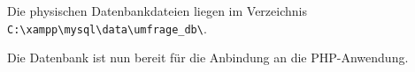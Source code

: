 Die physischen Datenbankdateien liegen im Verzeichnis \texttt{C:\textbackslash xampp\textbackslash mysql\textbackslash data\textbackslash umfrage\_db\textbackslash}.

Die Datenbank ist nun bereit für die Anbindung an die \acs{PHP}-Anwendung.

